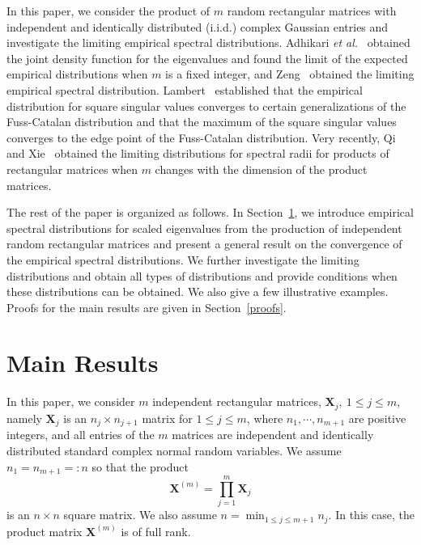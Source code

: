 \documentclass[11pt]{article}
\numberwithin{equation}{section}
\begin{document}
In this paper, we consider the product of $m$ random rectangular
matrices with independent and identically distributed (i.i.d.)
complex Gaussian entries and investigate the limiting empirical
spectral distributions. Adhikari {\it et al.}~\cite{ARRS2016}
obtained the joint density function for the eigenvalues and found
the limit of the expected empirical distributions when $m$ is a
fixed integer, and Zeng~\cite{Zeng2017} obtained the limiting
empirical spectral distribution. Lambert~\cite{Lambert2018}
established that the empirical distribution for square singular
values converges to certain generalizations of the Fuss-Catalan
distribution and that the maximum of the square singular values
converges to the edge point of the Fuss-Catalan distribution. Very
recently, Qi and Xie~\cite{QiXie2019} obtained the limiting
distributions for spectral radii for products of rectangular
matrices when $m$ changes with the dimension of the product
matrices.




The rest of the paper is organized as follows.  In
Section~\ref{main},  we introduce empirical spectral distributions
for scaled eigenvalues from the production of independent random
rectangular matrices and present a general result on the convergence
of the empirical spectral distributions. We further investigate the
limiting distributions and obtain all types of distributions and
provide conditions when these distributions can be obtained.  We
also give a few illustrative examples.  Proofs for the main results
are given in Section~\ref{proofs}.



\section{Main Results}\label{main}

In this paper, we consider $m$ independent rectangular matrices,
$\mathbf{X}_j,~ 1 \leq j \leq m$, namely $\mathbf{X}_j$ is an
$n_j\times n_{j+1}$ matrix for $1\le j\le m$, where $n_1, \cdots,
n_{m+1}$ are positive integers, and all entries of the $m$ matrices
are independent and identically distributed standard complex normal
random variables. We assume $n_1=n_{m+1}=:n$ so that the product
\[
\mathbf{X}^{(m)}=\prod^m_{j=1}\mathbf{X}_j\]
 is an $n\times n$ square
matrix. We also assume $n=\min_{1\le j\le m+1}n_j$.  In this case,
the product matrix $\mathbf{X}^{(m)}$ is of full rank.
\end{document}

